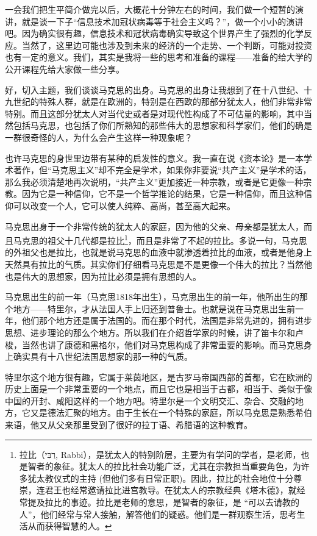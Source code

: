 \documentclass[UTF8, 12pt, a4paper]{ctexrep}
\begin{document}
一会我们把生平简介做完以后，大概花十分钟左右的时间，我们做一个短暂的演讲，就是谈一下子“信息技术加冠状病毒等于社会主义吗？”，做一个小小的演讲吧。因为确实很有趣，信息技术和冠状病毒确实导致这个世界产生了强烈的化学反应。当然了，这里边可能也涉及到未来的经济的一个走势、一个判断，可能对投资也有一定的意义。我们，其实是我将一些的思考和准备的课程——准备的给大学的公开课程先给大家做一些分享。

好，切入主题，我们谈谈马克思的出身。马克思的出身让我想到了在十八世纪、十九世纪的特殊人群，就是在欧洲的，特别是在西欧的那部分犹太人，他们非常非常特别。而且这部分犹太人对当代史或者是对现代性构成了不可估量的影响，其中当然包括马克思，也包括了你们所熟知的那些伟大的思想家和科学家们，他们的确是一群很奇怪的人，为什么会产生这样一种现象呢？

也许马克思的身世里边带有某种的启发性的意义。我一直在说《资本论》是一本学术著作，但“马克思主义”却不完全是学术，如果你非要说“共产主义”是学术的话，那么我必须清楚地再次说明，“共产主义”更加接近一种宗教，或者是它更像一种宗教。因为它是一种信仰，它不是一个哲学推论的结果，它是一种信仰，而且这种信仰可以改变一个人，它可以使人纯粹、高尚，甚至高大起来。

马克思出身于一个非常传统的犹太人的家庭，因为他的父亲、母亲都是犹太人，而且马克思的祖父十几代都是拉比\footnote{拉比（רַבִּי‎, Rabbi），是犹太人的特别阶层，主要为有学问的学者，是老师，也是智者的象征。犹太人的拉比社会功能广泛，尤其在宗教担当重要角色，为许多犹太教仪式的主持 (但他们多有日常正职)。因此，拉比的社会地位十分尊崇，连君王也经常邀请拉比进宫教导。在犹太人的宗教经典《塔木德》，就经常提及拉比的事迹。拉比是老师的意思，是智者的象征，是 “可以去请教的人”，他们经常与常人接触，解答他们的疑惑。他们是一群观察生活，思考生活从而获得智慧的人。}，而且是非常了不起的拉比。多说一句，马克思的外祖父也是拉比，也就是说马克思的血液中就渗透着拉比的血液，或者是他身上天然具有拉比的气质。其实你们仔细看马克思是不是更像一个伟大的拉比？当然他也是伟大的思想家，因为拉比必须是拥有思想的人。

马克思出生的前一年（马克思1818年出生），马克思出生的前一年，他所出生的那个地方——特里尔，才从法国人手上归还到普鲁士。也就是说在马克思出生前一年，他们那个地方还是属于法国的。而在那个时代，法国是非常先进的，拥有进步思想、进步理论的那么个地方。所以我们在介绍哲学家的时候，讲了笛卡尔和卢梭，当然也讲了康德和黑格尔，他们对马克思构成了非常重要的影响。而马克思身上确实具有十八世纪法国思想家的那一种的气质。

特里尔这个地方很有趣，它属于莱茵地区，是古罗马帝国西部的首都，它在欧洲的历史上面是一个非常重要的一个地点，而且它也是相当于古都，相当于、类似于像中国的开封、咸阳这样的一个地方吧。特里尔是一个文明交汇、杂合、交融的地方，它又是德法汇聚的地方。由于生长在一个特殊的家庭，所以马克思是熟悉希伯来语，他又从父亲那里受到了很好的拉丁语、希腊语的这种教育。
\end{document}
